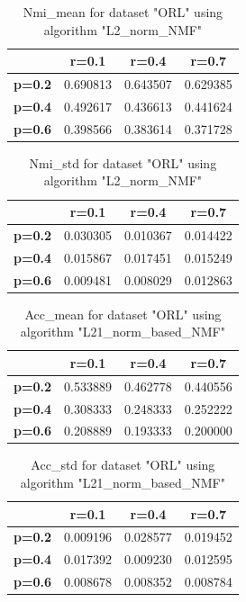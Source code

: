 \begin{table}[p]
\centering
\begin{tabular}{|c|c|c|c|}
\hline
 & \textbf{r=0.1} & \textbf{r=0.4} & \textbf{r=0.7} \\
\hline
\textbf{p=0.2} & 0.690813 & 0.643507 & 0.629385 \\
\hline
\textbf{p=0.4} & 0.492617 & 0.436613 & 0.441624 \\
\hline
\textbf{p=0.6} & 0.398566 & 0.383614 & 0.371728 \\
\hline
\end{tabular}
\caption{Nmi\_mean for dataset "ORL" using algorithm "L2\_norm\_NMF"}
\end{table}

\begin{table}[p]
\centering
\begin{tabular}{|c|c|c|c|}
\hline
 & \textbf{r=0.1} & \textbf{r=0.4} & \textbf{r=0.7} \\
\hline
\textbf{p=0.2} & 0.030305 & 0.010367 & 0.014422 \\
\hline
\textbf{p=0.4} & 0.015867 & 0.017451 & 0.015249 \\
\hline
\textbf{p=0.6} & 0.009481 & 0.008029 & 0.012863 \\
\hline
\end{tabular}
\caption{Nmi\_std for dataset "ORL" using algorithm "L2\_norm\_NMF"}
\end{table}

\begin{table}[p]
\centering
\begin{tabular}{|c|c|c|c|}
\hline
 & \textbf{r=0.1} & \textbf{r=0.4} & \textbf{r=0.7} \\
\hline
\textbf{p=0.2} & 0.533889 & 0.462778 & 0.440556 \\
\hline
\textbf{p=0.4} & 0.308333 & 0.248333 & 0.252222 \\
\hline
\textbf{p=0.6} & 0.208889 & 0.193333 & 0.200000 \\
\hline
\end{tabular}
\caption{Acc\_mean for dataset "ORL" using algorithm "L21\_norm\_based\_NMF"}
\end{table}

\begin{table}[p]
\centering
\begin{tabular}{|c|c|c|c|}
\hline
 & \textbf{r=0.1} & \textbf{r=0.4} & \textbf{r=0.7} \\
\hline
\textbf{p=0.2} & 0.009196 & 0.028577 & 0.019452 \\
\hline
\textbf{p=0.4} & 0.017392 & 0.009230 & 0.012595 \\
\hline
\textbf{p=0.6} & 0.008678 & 0.008352 & 0.008784 \\
\hline
\end{tabular}
\caption{Acc\_std for dataset "ORL" using algorithm "L21\_norm\_based\_NMF"}
\end{table}

